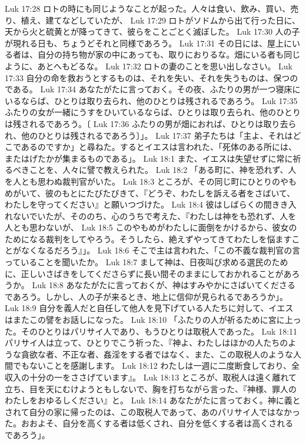 Luk 17:28  ロトの時にも同じようなことが起った。人々は食い、飲み、買い、売り、植え、建てなどしていたが、
Luk 17:29  ロトがソドムから出て行った日に、天から火と硫黄とが降ってきて、彼らをことごとく滅ぼした。
Luk 17:30  人の子が現れる日も、ちょうどそれと同様であろう。
Luk 17:31  その日には、屋上にいる者は、自分の持ち物が家の中にあっても、取りにおりるな。畑にいる者も同じように、あとへもどるな。
Luk 17:32  ロトの妻のことを思い出しなさい。
Luk 17:33  自分の命を救おうとするものは、それを失い、それを失うものは、保つのである。
Luk 17:34  あなたがたに言っておく。その夜、ふたりの男が一つ寝床にいるならば、ひとりは取り去られ、他のひとりは残されるであろう。
Luk 17:35  ふたりの女が一緒にうすをひいているならば、ひとりは取り去られ、他のひとりは残されるであろう。〔
Luk 17:36  ふたりの男が畑におれば、ひとりは取り去られ、他のひとりは残されるであろう〕」。
Luk 17:37  弟子たちは「主よ、それはどこであるのですか」と尋ねた。するとイエスは言われた、「死体のある所には、またはげたかが集まるものである」。
Luk 18:1  また、イエスは失望せずに常に祈るべきことを、人々に譬で教えられた。
Luk 18:2  「ある町に、神を恐れず、人を人とも思わぬ裁判官がいた。
Luk 18:3  ところが、その同じ町にひとりのやもめがいて、彼のもとにたびたびきて、『どうぞ、わたしを訴える者をさばいて、わたしを守ってください』と願いつづけた。
Luk 18:4  彼はしばらくの間きき入れないでいたが、そののち、心のうちで考えた、『わたしは神をも恐れず、人を人とも思わないが、
Luk 18:5  このやもめがわたしに面倒をかけるから、彼女のためになる裁判をしてやろう。そうしたら、絶えずやってきてわたしを悩ますことがなくなるだろう』」。
Luk 18:6  そこで主は言われた、「この不義な裁判官の言っていることを聞いたか。
Luk 18:7  まして神は、日夜叫び求める選民のために、正しいさばきをしてくださらずに長い間そのままにしておかれることがあろうか。
Luk 18:8  あなたがたに言っておくが、神はすみやかにさばいてくださるであろう。しかし、人の子が来るとき、地上に信仰が見られるであろうか」。
Luk 18:9  自分を義人だと自任して他人を見下げている人たちに対して、イエスはまたこの譬をお話しになった。
Luk 18:10  「ふたりの人が祈るために宮に上った。そのひとりはパリサイ人であり、もうひとりは取税人であった。
Luk 18:11  パリサイ人は立って、ひとりでこう祈った、『神よ、わたしはほかの人たちのような貪欲な者、不正な者、姦淫をする者ではなく、また、この取税人のような人間でもないことを感謝します。
Luk 18:12  わたしは一週に二度断食しており、全収入の十分の一をささげています』。
Luk 18:13  ところが、取税人は遠く離れて立ち、目を天にむけようともしないで、胸を打ちながら言った、『神様、罪人のわたしをおゆるしください』と。
Luk 18:14  あなたがたに言っておく。神に義とされて自分の家に帰ったのは、この取税人であって、あのパリサイ人ではなかった。おおよそ、自分を高くする者は低くされ、自分を低くする者は高くされるであろう」。
